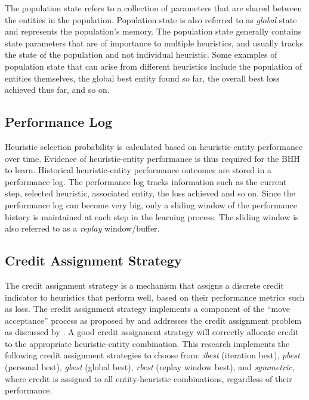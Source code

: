 The population state refers to a collection of parameters that are shared between the entities in the population. Population state is also referred to as \textit{global} state and represents the population's memory. The population state generally contains state parameters that are of importance to multiple heuristics, and usually tracks the state of the population and not individual heuristic. Some examples of population state that can arise from different heuristics include the population of entities themselves, the global best entity found so far, the overall best loss achieved thus far, and so on.

\subsection{Performance Log}\label{sec:bhh:performance_log}

Heuristic selection probability is calculated based on heuristic-entity performance over time. Evidence of heuristic-entity performance is thus required for the \acs{BHH} to learn. Historical heuristic-entity performance outcomes are stored in a performance log. The performance log tracks information such as the current step, selected heuristic, associated entity, the loss achieved and so on. Since the performance log can become very big, only a sliding window of the performance history is maintained at each step in the learning process. The sliding window is also referred to as a \textit{replay} window/buffer.

\subsection{Credit Assignment Strategy}
\label{sec:bhh:credit_assignment_strategy}

The credit assignment strategy is a mechanism that assigns a discrete credit indicator to heuristics that perform well, based on their performance metrics such as loss. The credit assignment strategy implements a component of the ``move acceptance'' process as proposed by \citeauthor{ref:ozcan:2006} \cite{ref:ozcan:2006,ref:ozcan:2008} and addresses the credit assignment problem as discussed by \citeauthor{ref:burke:2010} \cite{ref:burke:2010}. A good credit assignment strategy will correctly allocate credit to the appropriate heuristic-entity combination. This research implements the following credit assignment strategies to choose from: \textit{ibest} (iteration best), \textit{pbest} (personal best), \textit{gbest} (global best), \textit{rbest} (replay window best), and \textit{symmetric}, where credit is assigned to all entity-heuristic combinations, regardless of their performance.

